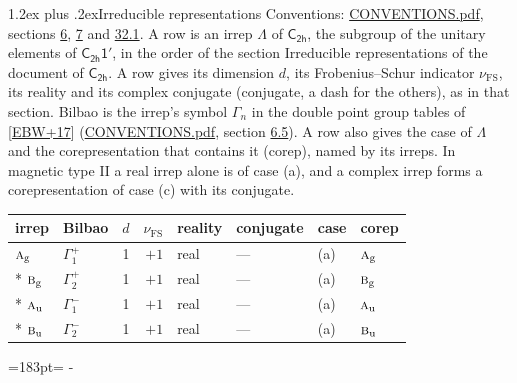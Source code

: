 \documentclass[10pt,a4paper]{article}
\makeatletter
\renewcommand\section{\@startsection{section}{1}{\z@}{-3ex plus -1ex minus -.2ex}%
  {1.2ex plus .2ex}{\normalfont\large\sffamily\bfseries\color{parttitle}}}
\newcommand{\needspace}[1]{\par\penalty-100\begingroup\dimen0=#1\relax\dimen2=\pagegoal
  \advance\dimen2-\pagetotal\ifdim\dimen0>\dimen2\relax\ifdim\dimen2>0pt\vfil\break\fi\fi
  \endgroup}
\numberwithin{equation}{section}
\newcommand{\grp}[1]{\mathsf{#1}}
\newcommand{\irr}[1]{\text{\normalfont\scshape #1}}
\newcommand{\ptag}[1]{\mathrm{#1}}
\newcommand{\fsind}{\nu_{\mathrm{FS}}}
\makeatother
\begin{document}
\section{Irreducible representations}\label{s:irreps}
Conventions: \href{../../CONVENTIONS.pdf}{CONVENTIONS.pdf}, sections \href{../../../rotation/CONVENTIONS.pdf\#conv.6}{6}, \href{../../../rotation/CONVENTIONS.pdf\#conv.7}{7} and \href{../../CONVENTIONS.pdf\#conv.32.1}{32.1}.
\leavevmode\label{n:irrep.Delta}A row is an irrep $\Lambda$ of $\grp{C_{2h}}$, the subgroup of the unitary elements of $\grp{C_{2h}1'}$, in the order of the section Irreducible representations of the document of \href{../../../rotation/data/pdf/C2h.pdf}{$\grp{C_{2h}}$}. \label{n:index.dimension}\label{n:index.frobenius}\label{n:head.irrep}\label{n:head.reality}\label{n:head.conjugate}A row gives its dimension $d$, its Frobenius--Schur indicator $\fsind$, its reality and its complex conjugate (conjugate, a dash for the others), as in that section. \label{n:head.bilbao}\label{n:irrep.alias.gamma}Bilbao is the irrep's symbol $\Gamma_n$ in the double point group tables of [\href{../../../REFERENCES.pdf\#ref.EBW+17}{EBW+17}] (\href{../../CONVENTIONS.pdf}{CONVENTIONS.pdf}, section \href{../../../rotation/CONVENTIONS.pdf\#conv.6.5}{6.5}). \label{n:head.case.corep}\label{n:head.corep}A row also gives the case of $\Lambda$ and the corepresentation that contains it (corep), named by its irreps. In magnetic type II a real irrep alone is of case (a), and a complex irrep forms a corepresentation of case (c) with its conjugate.
\setlength{\emergencystretch}{2em}\par\setlength{\emergencystretch}{0pt}
{\small\renewcommand{\arraystretch}{1.25}\setlength{\tabcolsep}{4pt}\begin{longtable}{@{}llrrllll@{}}\toprule
irrep & Bilbao & $d$ & $\fsind$ & reality & conjugate & case & corep\\\midrule\endhead
\bottomrule\endfoot\endlastfoot
$\irr{a}_{\ptag{g}}$ & $\Gamma_{1}^{+}$ & 1 & $+1$ & real & --- & (a) & $\irr{a}_{\ptag{g}}$\\*
$\irr{b}_{\ptag{g}}$ & $\Gamma_{2}^{+}$ & 1 & $+1$ & real & --- & (a) & $\irr{b}_{\ptag{g}}$\\*
$\irr{a}_{\ptag{u}}$ & $\Gamma_{1}^{-}$ & 1 & $+1$ & real & --- & (a) & $\irr{a}_{\ptag{u}}$\\*
$\irr{b}_{\ptag{u}}$ & $\Gamma_{2}^{-}$ & 1 & $+1$ & real & --- & (a) & $\irr{b}_{\ptag{u}}$\\
\bottomrule\end{longtable}}
\needspace{183pt}
\end{document}
